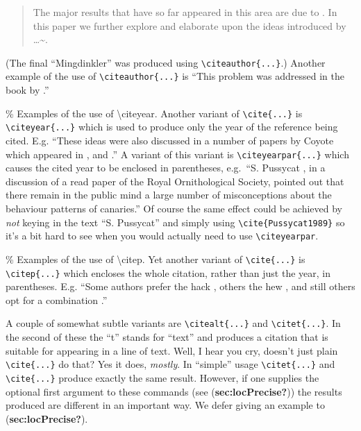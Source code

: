 \documentclass[
  times,
  doublespace]{anzsauth}
\begin{document}
\begin{quote}
The major results that have so far appeared in this area are due to
\cite{Mingdinkler1999}. In this paper we further explore and elaborate
upon the ideas introduced by \citeauthor{Mingdinkler1999}
\ldots\textasciitilde.
\end{quote}

(The final ``Mingdinkler'' was produced using
\texttt{\textbackslash{}citeauthor\{...\}}.) Another example of the use
of \texttt{\textbackslash{}citeauthor\{...\}} is ``This problem was
addressed in the book by \citeauthor{Thecowsoutside1984}.''

\% Examples of the use of \textbackslash citeyear. Another variant of
\texttt{\textbackslash{}cite\{...\}} is
\texttt{\textbackslash{}citeyear\{...\}} which is used to produce only
the year of the reference being cited. E.g. ``These ideas were also
discussed in a number of papers by Coyote which appeared in
\citeyear{Coyote2001}, \citeyear{Coyote2007} and
\citeyear{Coyote2010}.'' A variant of this variant is
\texttt{\textbackslash{}citeyearpar\{...\}} which causes the cited year
to be enclosed in parentheses, e.g.~``S. Pussycat
\citeyearpar{Pussycat1989}, in a discussion of a read paper of the Royal
Ornithological Society, pointed out that there remain in the public mind
a large number of misconceptions about the behaviour patterns of
canaries.'' Of course the same effect could be achieved by \emph{not}
keying in the text ``S. Pussycat'' and simply using
\texttt{\textbackslash{}cite\{Pussycat1989\}} so it's a bit hard to see
when you would actually need to use
\texttt{\textbackslash{}citeyearpar}.

\% Examples of the use of \textbackslash citep. Yet another variant of
\texttt{\textbackslash{}cite\{...\}} is
\texttt{\textbackslash{}citep\{...\}} which encloses the whole citation,
rather than just the year, in parentheses. E.g. ``Some authors prefer
the hack \citep{Cook1966}, others the hew \citep{Moore1967}, and still
others opt for a combination \citep{CookMoore1968}.''

A couple of somewhat subtle variants are
\texttt{\textbackslash{}citealt\{...\}} and
\texttt{\textbackslash{}citet\{...\}}. In the second of these the ``t''
stands for ``text'' and produces a citation that is suitable for
appearing in a line of text. Well, I hear you cry, doesn't just plain
\texttt{\textbackslash{}cite\{...\}} do that? Yes it does,
\emph{mostly}. In ``simple'' usage \texttt{\textbackslash{}citet\{...\}}
and \texttt{\textbackslash{}cite\{...\}} produce exactly the same
result. However, if one supplies the optional first argument to these
commands (see (\textbf{sec:locPrecise?})) the results produced are
different in an important way. We defer giving an example to
(\textbf{sec:locPrecise?}).
\end{document}

